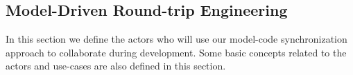 \subsection{Model-Driven Round-trip Engineering}
\label{subsec:mdrtebackground}

In this section we define the actors who will use our model-code synchronization approach to collaborate during development.
Some basic concepts related to the actors and use-cases are also defined in this section.







\begin{comment}

\begin{definition}[Baseline artifact]
	A baseline artifact is one which may be edited manually.
	All other artifacts are produced from the baseline artifact
	through some process, and only through a process. Manual edition
	of artifacts other than the baseline artifact is forbidden.
\end{definition}
\end{comment}

